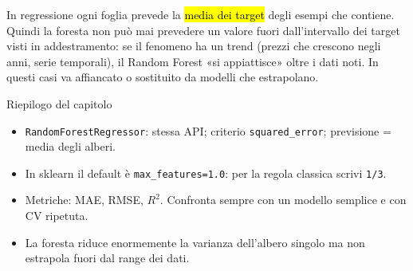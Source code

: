\begin{attenzione}
In regressione ogni foglia prevede la \hl{media dei target} degli esempi che contiene. Quindi la foresta non può mai prevedere un valore fuori dall'intervallo dei target visti in addestramento: se il fenomeno ha un trend (prezzi che crescono negli anni, serie temporali), il Random Forest «si appiattisce» oltre i dati noti. In questi casi va affiancato o sostituito da modelli che estrapolano.
\end{attenzione}

\begin{appunti}{Riepilogo del capitolo}
\begin{itemize}
  \item \texttt{RandomForestRegressor}: stessa API; criterio \texttt{squared\_error}; previsione = media degli alberi.
  \item In sklearn il default è \texttt{max\_features=1.0}: per la regola classica scrivi \texttt{1/3}.
  \item Metriche: MAE, RMSE, $R^2$. Confronta sempre con un modello semplice e con CV ripetuta.
  \item La foresta riduce enormemente la varianza dell'albero singolo ma non estrapola fuori dal range dei dati.
\end{itemize}
\end{appunti}
